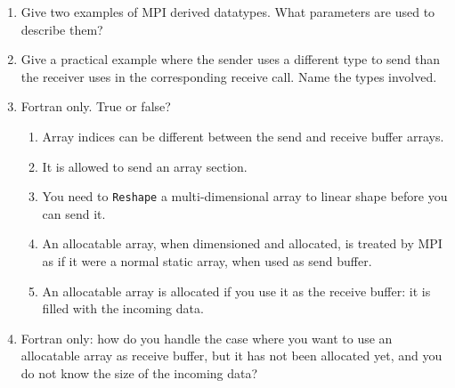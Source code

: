 \begin{enumerate}
\item Give two examples of MPI derived datatypes. What parameters are used
to describe them?

\item Give a practical example where the sender uses a different type to send
  than the receiver uses in the corresponding receive call. Name the types involved.

\item Fortran only. True or false?
  \begin{enumerate}
  \item Array indices can be different between the send and receive buffer arrays.
  \item It is allowed to send an array section.
  \item You need to \lstinline{Reshape} a multi-dimensional array
    to linear shape before you can send it.
  \item An allocatable array, when dimensioned and allocated, is
    treated by MPI as if it were a normal static array, when used as
    send buffer.
  \item An allocatable array is allocated if you use it as the receive
    buffer: it is filled with the incoming data.
  \end{enumerate}
\item Fortran only: how do you handle the case where you want to use
  an allocatable array as receive buffer, but it has not been
  allocated yet, and you do not know the size of the incoming data?

\end{enumerate}

